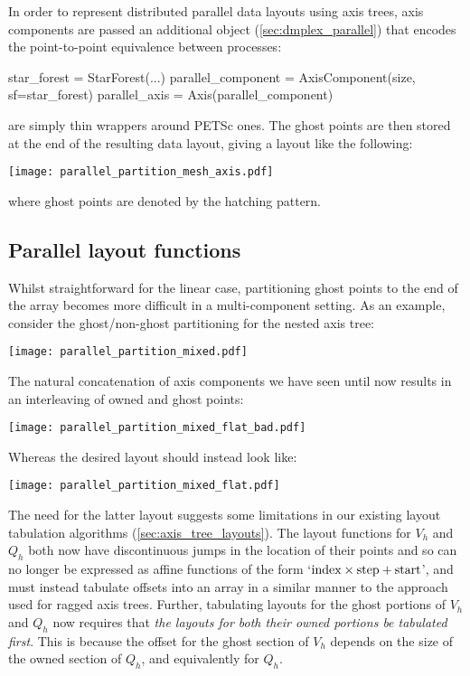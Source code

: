\documentclass[thesis]{subfiles}
\begin{document}
In order to represent distributed parallel data layouts using axis trees, axis components are passed an additional  object (\cref{sec:dmplex_parallel}) that encodes the point-to-point equivalence between processes:
\begin{pyinline}
  star_forest = StarForest(...)
  parallel_component = AxisComponent(size, sf=star_forest)
  parallel_axis = Axis(parallel_component)
\end{pyinline}
  are simply thin wrappers around PETSc ones.
The ghost points are then stored at the end of the resulting data layout, giving a layout like the following:
\begin{center}
  \texttt{[image: parallel\_partition\_mesh\_axis.pdf]}
\end{center}
where ghost points are denoted by the hatching pattern.

\subsection{Parallel layout functions}

Whilst straightforward for the linear case, partitioning ghost points to the end of the array becomes more difficult in a multi-component setting.
As an example, consider the ghost/non-ghost partitioning for the nested axis tree:
\begin{center}
  \texttt{[image: parallel\_partition\_mixed.pdf]}
\end{center}
The natural concatenation of axis components we have seen until now results in an interleaving of owned and ghost points:
\begin{center}
  \texttt{[image: parallel\_partition\_mixed\_flat\_bad.pdf]}
\end{center}
Whereas the desired layout should instead look like:
\begin{center}
  \texttt{[image: parallel\_partition\_mixed\_flat.pdf]}
\end{center}

The need for the latter layout suggests some limitations in our existing layout tabulation algorithms (\cref{sec:axis_tree_layouts}).
The layout functions for $V_h$ and $Q_h$ both now have discontinuous jumps in the location of their points and so can no longer be expressed as affine functions of the form `$\textnormal{index} \times \textnormal{step} + \textnormal{start}$', and must instead tabulate offsets into an array in a similar manner to the approach used for ragged axis trees.
Further, tabulating layouts for the ghost portions of $V_h$ and $Q_h$ now requires that \emph{the layouts for both their owned portions be tabulated first}.
This is because the offset for the ghost section of $V_h$ depends on the size of the owned section of $Q_h$, and equivalently for $Q_h$.
\end{document}
